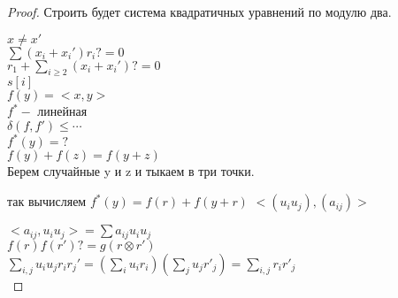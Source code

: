 \begin{proof}
Строить будет система квадратичных уравнений по модулю два. 

$x \ne x'$\\
$\sum (x_i + x_i') r_i ?= 0$\\
$r_1 + \sum_{i \ge 2}(x_i + x_i') ?= 0$\\

$s[i]$\\
$f(y) = <x, y>$\\
$f^* -$ линейная\\
$\delta(f,f') \le \cdots$ \\
$f^*(y) = ?$\\
$f(y) + f(z) = f(y + z)$\\

Берем случайные y и z и тыкаем в три точки. 
        
      так вычисляем
$f^*(y) = f(r) + f(y + r)$
$<(u_iu_j), (a_{ij})>$

$<a_{ij}, u_iu_j > = \sum a_{ij}u_iu_j$\\

$f(r)f(r') ?= g(r \otimes r')$\\
$\sum_{i,j}u_iu_j r_ir_j' = (\sum_{i}u_ir_i)(\sum_{j}u_jr'_j) = \sum_{i,j}r_ir'_j$\\


        
 
\end{proof}




